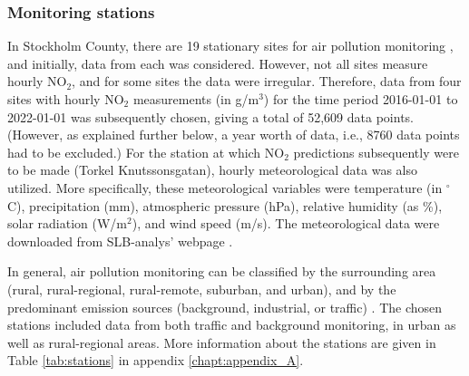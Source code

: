 \subsubsection{Monitoring stations}
In Stockholm County, there are 19 stationary sites for air pollution monitoring \cite{slb-matningar}, and initially, data from each was considered. However, not all sites measure hourly NO$_2$, and for some sites the data were irregular. Therefore, data from four sites with hourly NO$_2$ measurements (in \textmugreek g/m$^3$) for the time period 2016-01-01 to 2022-01-01 was subsequently chosen, giving a total of 52,609 data points. (However, as explained further below, a year worth of data, i.e., 8760 data points had to be excluded.) For the station at which NO$_2$ predictions subsequently were to be made (Torkel Knutssonsgatan), hourly meteorological data was also utilized. More specifically, these meteorological variables were temperature (in $^\circ$C), precipitation (mm), atmospheric pressure (hPa), relative humidity (as \%), solar radiation (W/m$^2$), and wind speed (m/s). The meteorological data were downloaded from SLB-analys' webpage \cite{slb-analys-meteorologi}. 

In general, air pollution monitoring can be classified by the surrounding area (rural, rural-regional, rural-remote, suburban, and urban), and by the predominant emission sources (background, industrial, or traffic) \cite{smhi-luftmatningar}. The chosen stations included data from both traffic and background monitoring, in urban as well as rural-regional areas. More information about the stations are given in Table \ref{tab:stations} in appendix \ref{chapt:appendix_A}. 

